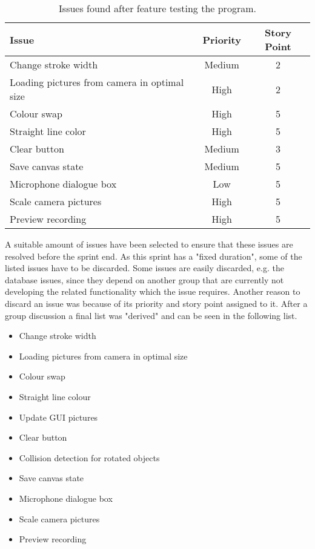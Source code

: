 \begin{table}[h]
\begin{tabular}{|p{5cm}|c|c|}
\hline 
Issue & Priority & Story Point \\ 
\hline 
Change stroke width & Medium & 2 \\ 
\hline 
Loading pictures from camera in optimal size & High & 2 \\ 
\hline 
Colour swap & High & 5 \\ 
\hline 
Straight line color & High & 5 \\ 
\hline 
Clear button & Medium & 3 \\ 
\hline 
Save canvas state & Medium & 5 \\ 
\hline 
Microphone dialogue box & Low & 5 \\ 
\hline 
Scale camera pictures & High & 5 \\ 
\hline 
Preview recording & High & 5 \\ 
\hline 
\end{tabular}
\caption{Issues found after feature testing the program.}
\label{table:newissues}
\end{table}

A suitable amount of issues have been selected to ensure that these issues are resolved before the sprint end.
As this sprint has a "fixed duration", some of the listed issues have to be discarded.
Some issues are easily discarded, e.g. the database issues, since they depend on another group that are currently not developing the related functionality which the issue requires.
Another reason to discard an issue was because of its priority and story point assigned to it.
After a group discussion a final list was "derived" and can be seen in the following list.

\begin{itemize}
	\item Change stroke width
	\item Loading pictures from camera in optimal size
	\item Colour swap
	\item Straight line colour
	\item Update GUI pictures
	\item Clear button
	\item Collision detection for rotated objects
	\item Save canvas state
	\item Microphone dialogue box
	\item Scale camera pictures
	\item Preview recording
\end{itemize}









